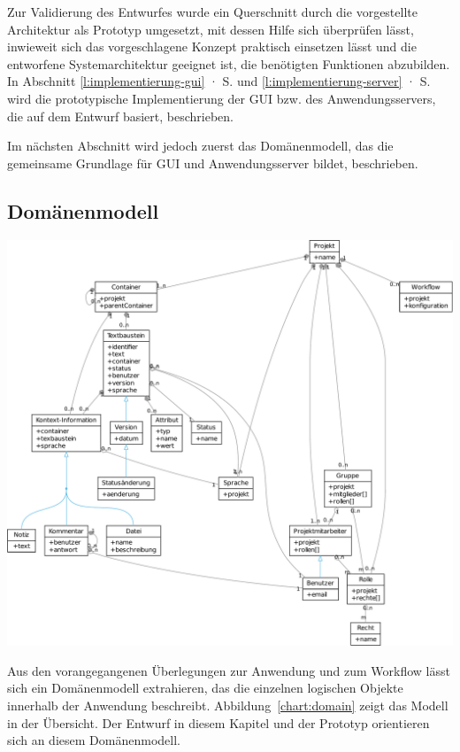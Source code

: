 Zur Validierung des Entwurfes wurde ein Querschnitt durch die vorgestellte Architektur als Prototyp umgesetzt, mit dessen Hilfe sich überprüfen lässt, inwieweit sich das vorgeschlagene Konzept praktisch einsetzen lässt und die entworfene Systemarchitektur geeignet ist, die benötigten Funktionen abzubilden. In Abschnitt \ref{l:implementierung-gui} · S.\pageref{l:implementierung-gui} und \ref{l:implementierung-server} · S.\pageref{l:implementierung-server} wird die prototypische Implementierung der GUI bzw. des Anwendungsservers, die auf dem Entwurf basiert, beschrieben.

Im nächsten Abschnitt wird jedoch zuerst das Domänenmodell, das die gemeinsame Grundlage für GUI und Anwendungsserver bildet, beschrieben.

\pagebreak

\subsection{Domänenmodell}\label{l:domänenmodell}

\begin{center}
\includegraphics[width=\textwidth]{media/domain.pdf}
\label{chart:domain}
\end{center}

Aus den vorangegangenen Überlegungen zur Anwendung und zum Workflow lässt sich ein Domänenmodell extrahieren, das die einzelnen logischen Objekte innerhalb der Anwendung beschreibt. Abbildung~\ref{chart:domain} zeigt das Modell in der Übersicht. Der Entwurf in diesem Kapitel und der Prototyp orientieren sich an diesem Domänenmodell.

